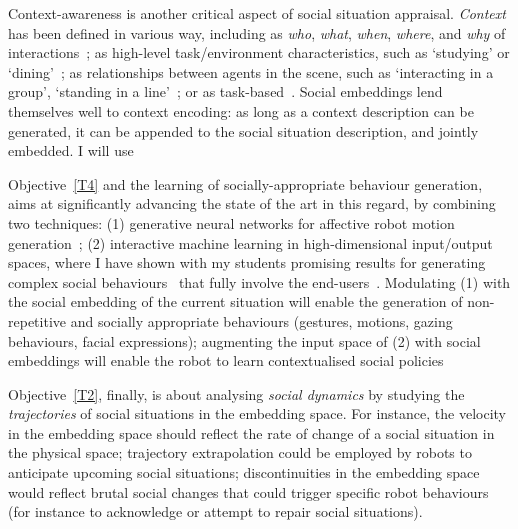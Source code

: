 Context-awareness is another critical aspect of social situation appraisal.
\emph{Context} has been defined in various way, including as \emph{who},
\emph{what}, \emph{when}, \emph{where}, and \emph{why} of
interactions~\cite{vinciarelli2009social}; as high-level task/environment
characteristics, such as `studying' or `dining'~\cite{nigam2015social}; as
relationships between agents in the scene, such as `interacting in a group',
`standing in a line'~\cite{althaus2004navigation}; or as
task-based~\cite{castellano2012detecting}. Social embeddings lend themselves
well to context encoding: as long as a context description can be generated, it
can be appended to the social situation description, and jointly embedded.
I will use 
%



Objective~\ref{T4} and the learning of socially-appropriate behaviour
generation, \project aims at significantly advancing the state of the art in
this regard, by combining two techniques: (1) generative neural networks
for affective robot motion
generation~\cite{marmpena2019generating,suguitan2020moveae}; (2) interactive
machine learning in high-dimensional input/output spaces, where I have shown
with my students promising results for generating complex social
behaviours~\cite{senft2019teaching, winkle2020couch} that fully involve the
end-users~\cite{winkle2018social}. Modulating (1) with the social embedding of
the current situation will enable the generation of non-repetitive and socially
appropriate behaviours (gestures, motions, gazing behaviours, facial
expressions); augmenting the input space of (2) with social embeddings will
enable the robot to learn contextualised social policies

Objective~\ref{T2}, finally, is about analysing \emph{social dynamics} by
studying the \emph{trajectories} of social situations in the embedding space.
For instance, the velocity in the embedding space should reflect the rate of
change of a social situation in the physical space; trajectory extrapolation
could be employed by robots to anticipate upcoming social situations;
discontinuities in the embedding space would reflect brutal social changes that
could trigger specific robot behaviours (for instance to acknowledge or attempt
to repair social situations).



